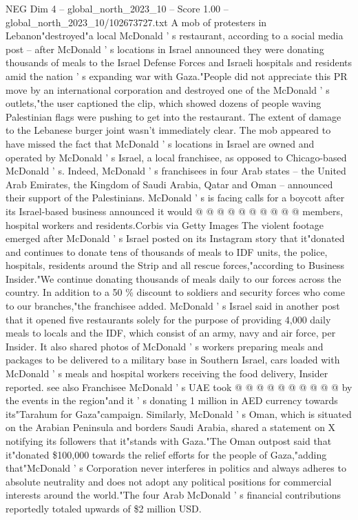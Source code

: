 \begin{textsample}{NEG Dim 4 – global\_north\_2023\_10 – Score 1.00 – global\_north\_2023\_10/102673727.txt}  \label{ex:f4_neg_011}
A mob of protesters in Lebanon"destroyed"a local McDonald ' s restaurant, according to a social media post -- after McDonald ' s locations in Israel announced they were donating thousands of meals to the Israel Defense Forces and Israeli hospitals and residents amid the nation ' s expanding war with Gaza."People did not appreciate this PR move by an international corporation and destroyed one of the McDonald ' s outlets,"the user captioned the clip, which showed dozens of people waving Palestinian flags were pushing to get into the restaurant.
The extent of damage to the Lebanese burger joint wasn't immediately clear.
The mob appeared to have missed the fact that McDonald ' s locations in Israel are owned and operated by McDonald ' s Israel, a local franchisee, as opposed to Chicago-based McDonald ' s.
Indeed, McDonald ' s franchisees in four Arab states -- the United Arab Emirates, the Kingdom of Saudi Arabia, Qatar and Oman -- announced their support of the Palestinians.
McDonald ' s is facing calls for a boycott after its Israel-based business announced it would @ @ @ @ @ @ @ @ @ @ members, hospital workers and residents.Corbis via Getty Images The violent footage emerged after McDonald ' s Israel posted on its Instagram story that it"donated and continues to donate tens of thousands of meals to IDF units, the police, hospitals, residents around the Strip and all rescue forces,"according to Business Insider."We continue donating thousands of meals daily to our forces across the country.
In addition to a 50 \% discount to soldiers and security forces who come to our branches,"the franchisee added.
McDonald ' s Israel said in another post that it opened five restaurants solely for the purpose of providing 4,000 daily meals to locals and the IDF, which consist of an army, navy and air force, per Insider.
It also shared photos of McDonald ' s workers preparing meals and packages to be delivered to a military base in Southern Israel, cars loaded with McDonald ' s meals and hospital workers receiving the food delivery, Insider reported. see also Franchisee McDonald ' s UAE took @ @ @ @ @ @ @ @ @ @ by the events in the region"and it ' s donating 1 million in AED currency towards its"Tarahum for Gaza"campaign.
Similarly, McDonald ' s Oman, which is situated on the Arabian Peninsula and borders Saudi Arabia, shared a statement on X notifying its followers that it"stands with Gaza."The Oman outpost said that it"donated \$100,000 towards the relief efforts for the people of Gaza,"adding that"McDonald ' s Corporation never interferes in politics and always adheres to absolute neutrality and does not adopt any political positions for commercial interests around the world."The four Arab McDonald ' s financial contributions reportedly totaled upwards of \$2 million USD.

\end{textsample}
